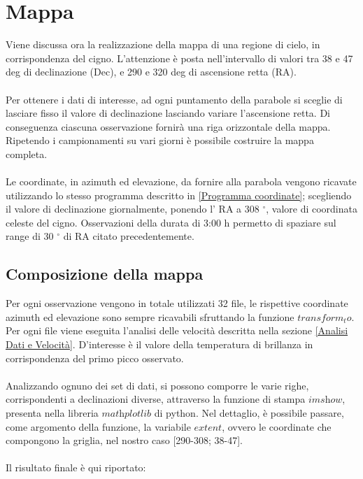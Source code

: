 \section{Mappa}

Viene discussa ora la realizzazione della mappa di una regione di cielo, in corrispondenza del cigno. L'attenzione è posta nell'intervallo di valori tra 38 e 47 deg di declinazione (Dec), e 290 e 320 deg di ascensione retta (RA).
\\\\
Per ottenere i dati di interesse, ad ogni puntamento della parabole si sceglie di lasciare fisso il valore di declinazione lasciando variare l'ascensione retta. Di conseguenza ciascuna osservazione fornirà una riga orizzontale della mappa. Ripetendo i campionamenti su vari giorni è possibile costruire la mappa completa. 
\\\\
Le coordinate, in azimuth ed elevazione, da fornire alla parabola vengono ricavate utilizzando lo stesso programma descritto in \ref{Programma coordinate}; scegliendo il valore di declinazione giornalmente, ponendo l' RA a 308 $^{\circ}$, valore di coordinata celeste del cigno. Osservazioni della durata di 3:00 h permetto di spaziare sul range di 30 $^{\circ}$ di RA citato precedentemente.



\subsection{Composizione della mappa}

Per ogni osservazione vengono in totale utilizzati 32 file, le rispettive coordinate azimuth ed elevazione sono sempre ricavabili sfruttando la funzione $transform_to$. Per ogni file viene eseguita l'analisi delle velocità descritta nella sezione \ref{Analisi Dati e Velocità}. D'interesse è il valore della temperatura di brillanza in corrispondenza del primo picco osservato. 
\\\\
Analizzando ognuno dei set di dati, si possono comporre le varie righe, corrispondenti a declinazioni diverse, attraverso la funzione di stampa $\textit{imshow}$, presenta nella libreria $\textit{mathplotlib}$ di python. Nel dettaglio, è possibile passare, come argomento della funzione, la variabile $\textit{extent}$, ovvero le coordinate che compongono la griglia, nel nostro caso [290-308; 38-47].
\\\\
Il risultato finale è qui riportato: 

